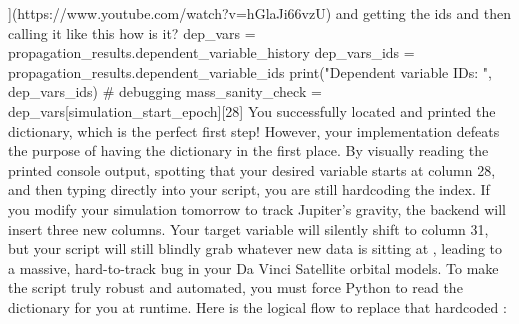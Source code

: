 {}](https://www.youtube.com/watch?v=hGlaJi66vzU)\markdownRendererInterblockSeparator
{}\markdownRendererInterblockSeparator
{}\markdownRendererInterblockSeparator
{}\markdownRendererThematicBreak{}\markdownRendererInterblockSeparator
{}
\markdownRendererSectionEnd 
\markdownRendererSectionEnd \markdownRendererSectionBegin
{}\markdownRendererInterblockSeparator
{}and getting the ids and then calling it like this how is it? dep_vars = propagation_results.dependent_variable_history dep_vars_ids = propagation_results.dependent_variable_ids print("Dependent variable IDs: ", dep_vars_ids) # debugging\markdownRendererInterblockSeparator
{}
\markdownRendererSectionEnd 
\markdownRendererSectionEnd \markdownRendererSectionBegin
{}\markdownRendererInterblockSeparator
{}mass_sanity_check = dep_vars[simulation_start_epoch][28]\markdownRendererInterblockSeparator
{}\markdownRendererSectionBegin
{}\markdownRendererInterblockSeparator
{}\markdownRendererSectionBegin
{}\markdownRendererInterblockSeparator
{}You successfully located and printed the dictionary, which is the perfect first step! However, your implementation defeats the purpose of having the dictionary in the first place.\markdownRendererInterblockSeparator
{}By visually reading the printed console output, spotting that your desired variable starts at column 28, and then typing \markdownRendererCodeSpan{[28]} directly into your script, you are still hardcoding the index.\markdownRendererInterblockSeparator
{}If you modify your simulation tomorrow to track Jupiter's gravity, the backend will insert three new columns. Your target variable will silently shift to column 31, but your script will still blindly grab whatever new data is sitting at \markdownRendererCodeSpan{[28]}, leading to a massive, hard-to-track bug in your Da Vinci Satellite orbital models.\markdownRendererInterblockSeparator
{}
\markdownRendererSectionEnd \markdownRendererSectionBegin
{}\markdownRendererInterblockSeparator
{}To make the script truly robust and automated, you must force Python to read the dictionary for you at runtime. Here is the logical flow to replace that hardcoded \markdownRendererCodeSpan{[28]}:\markdownRendererInterblockSeparator
